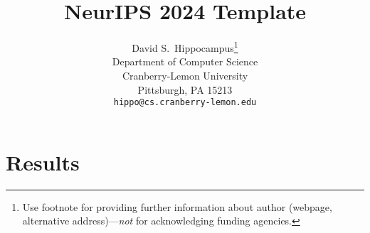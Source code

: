 \documentclass{article}
\title{NeurIPS 2024 Template}
\author{%
  David S.~Hippocampus\thanks{Use footnote for providing further information
    about author (webpage, alternative address)---\emph{not} for acknowledging
    funding agencies.} \\
  Department of Computer Science\\
  Cranberry-Lemon University\\
  Pittsburgh, PA 15213 \\
  \texttt{hippo@cs.cranberry-lemon.edu} \\
}
\begin{document}
\maketitle



















\newpage




\newpage

\newpage
\appendix
\appendixpage

\section{Results}
\end{document}
